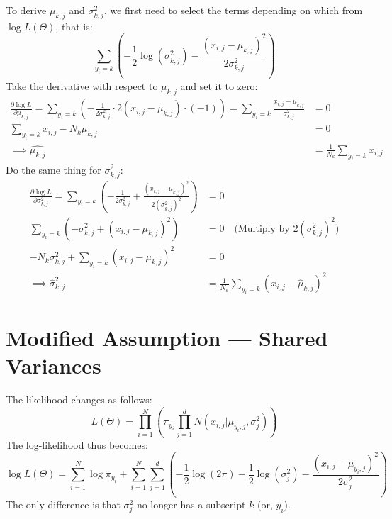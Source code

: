 \documentclass[11pt, a4paper, oneside]{memoir}
\begin{document}
To derive $\mu_{k,j}$ and $\sigma^2_{k,j}$, we first need to select the terms depending on which from $\log L(\Theta)$, that is:
\[ \sum_{y_i=k} \left( -\frac{1}{2} \log(\sigma^2_{k,j}) - \frac{(x_{i,j} - \mu_{k,j})^2}{2\sigma^2_{k,j}} \right) \]
Take the derivative with respect to $\mu_{k,j}$ and set it to zero:
\begin{align*}
  \frac{\partial \log L}{\partial \mu_{k,j}} = \sum_{y_i=k} \left( - \frac{1}{2\sigma^2_{k,j}} \cdot 2(x_{i,j} - \mu_{k,j}) \cdot (-1) \right)
  = \sum_{y_i=k} \frac{x_{i,j} - \mu_{k,j}}{\sigma^2_{k,j}} &= 0 \\
  \sum_{y_i=k} x_{i,j} - N_k \mu_{k,j} &= 0 \\
  \implies \hat{\mu_{k,j}} &= \frac{1}{N_k} \sum_{y_i=k} x_{i,j}
\end{align*}
Do the same thing for $\sigma^2_{k,j}$:
\begin{align*}
  \frac{\partial \log L}{\partial \sigma^2_{k,j}} = \sum_{y_i=k} \left( -\frac{1}{2\sigma^2_{k,j}} + \frac{(x_{i,j} - \mu_{k,j})^2}{2(\sigma^2_{k,j})^2} \right) &= 0 \\
  \sum_{y_i=k} \left( -\sigma^2_{k,j} + (x_{i,j} - \mu_{k,j})^2 \right) &= 0 \quad \text{(Multiply by } 2(\sigma^2_{k,j})^2 \text{)} \\
  -N_k \sigma^2_{k,j} + \sum_{y_i=k} (x_{i,j} - \mu_{k,j})^2 &= 0 \\
  \implies \hat{\sigma}^2_{k,j} &= \frac{1}{N_k} \sum_{y_i=k} (x_{i,j} - \hat{\mu}_{k,j})^2
\end{align*}

\section{Modified Assumption — Shared Variances}
The likelihood changes as follows:
\[ L(\Theta) = \prod_{i=1}^{N} \left( \pi_{y_i} \prod_{j=1}^{d} N(x_{i,j} | \mu_{y_i,j}, \sigma^2_{j}) \right) \]
The log-likelihood thus becomes:
\[ \log L(\Theta) = \sum_{i=1}^{N} \log \pi_{y_i} + \sum_{i=1}^{N} \sum_{j=1}^{d} \left( -\frac{1}{2} \log(2\pi) - \frac{1}{2} \log(\sigma^2_{j}) - \frac{(x_{i,j} - \mu_{y_i,j})^2}{2\sigma^2_{j}} \right) \]
The only difference is that $\sigma^2_j$ no longer has a subscript $k$ (or, $y_i$).
\end{document}
